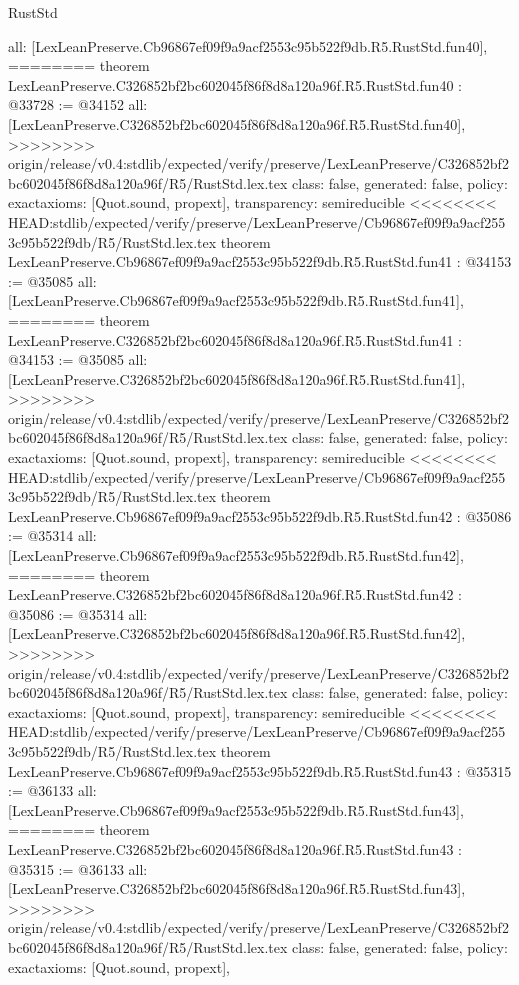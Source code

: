 \begin{lexlean}{RustStd}
\begin{coremodule}
{\begin{coremodule}
{{{{{{{{{{{{{{{{{{{{{{{{{{{{{{{{{{{{{{{{{{{  all: [LexLeanPreserve.Cb96867ef09f9a9acf2553c95b522f9db.R5.RustStd.fun40],
========
theorem LexLeanPreserve.C326852bf2bc602045f86f8d8a120a96f.R5.RustStd.fun40 : @33728 := @34152 {
  all: [LexLeanPreserve.C326852bf2bc602045f86f8d8a120a96f.R5.RustStd.fun40],
>>>>>>>> origin/release/v0.4:stdlib/expected/verify/preserve/LexLeanPreserve/C326852bf2bc602045f86f8d8a120a96f/R5/RustStd.lex.tex
  class: false,
  generated: false,
  policy: exact{axioms: [Quot.sound, propext]},
  transparency: semireducible
}
<<<<<<<< HEAD:stdlib/expected/verify/preserve/LexLeanPreserve/Cb96867ef09f9a9acf2553c95b522f9db/R5/RustStd.lex.tex
theorem LexLeanPreserve.Cb96867ef09f9a9acf2553c95b522f9db.R5.RustStd.fun41 : @34153 := @35085 {
  all: [LexLeanPreserve.Cb96867ef09f9a9acf2553c95b522f9db.R5.RustStd.fun41],
========
theorem LexLeanPreserve.C326852bf2bc602045f86f8d8a120a96f.R5.RustStd.fun41 : @34153 := @35085 {
  all: [LexLeanPreserve.C326852bf2bc602045f86f8d8a120a96f.R5.RustStd.fun41],
>>>>>>>> origin/release/v0.4:stdlib/expected/verify/preserve/LexLeanPreserve/C326852bf2bc602045f86f8d8a120a96f/R5/RustStd.lex.tex
  class: false,
  generated: false,
  policy: exact{axioms: [Quot.sound, propext]},
  transparency: semireducible
}
<<<<<<<< HEAD:stdlib/expected/verify/preserve/LexLeanPreserve/Cb96867ef09f9a9acf2553c95b522f9db/R5/RustStd.lex.tex
theorem LexLeanPreserve.Cb96867ef09f9a9acf2553c95b522f9db.R5.RustStd.fun42 : @35086 := @35314 {
  all: [LexLeanPreserve.Cb96867ef09f9a9acf2553c95b522f9db.R5.RustStd.fun42],
========
theorem LexLeanPreserve.C326852bf2bc602045f86f8d8a120a96f.R5.RustStd.fun42 : @35086 := @35314 {
  all: [LexLeanPreserve.C326852bf2bc602045f86f8d8a120a96f.R5.RustStd.fun42],
>>>>>>>> origin/release/v0.4:stdlib/expected/verify/preserve/LexLeanPreserve/C326852bf2bc602045f86f8d8a120a96f/R5/RustStd.lex.tex
  class: false,
  generated: false,
  policy: exact{axioms: [Quot.sound, propext]},
  transparency: semireducible
}
<<<<<<<< HEAD:stdlib/expected/verify/preserve/LexLeanPreserve/Cb96867ef09f9a9acf2553c95b522f9db/R5/RustStd.lex.tex
theorem LexLeanPreserve.Cb96867ef09f9a9acf2553c95b522f9db.R5.RustStd.fun43 : @35315 := @36133 {
  all: [LexLeanPreserve.Cb96867ef09f9a9acf2553c95b522f9db.R5.RustStd.fun43],
========
theorem LexLeanPreserve.C326852bf2bc602045f86f8d8a120a96f.R5.RustStd.fun43 : @35315 := @36133 {
  all: [LexLeanPreserve.C326852bf2bc602045f86f8d8a120a96f.R5.RustStd.fun43],
>>>>>>>> origin/release/v0.4:stdlib/expected/verify/preserve/LexLeanPreserve/C326852bf2bc602045f86f8d8a120a96f/R5/RustStd.lex.tex
  class: false,
  generated: false,
  policy: exact{axioms: [Quot.sound, propext]},
}}}}}}}}}}}}}}}}}}}}}}}}}}}}}}}}}}}}}}}}}}}}}}}
\end{coremodule}}
\end{coremodule}
\end{lexlean}
